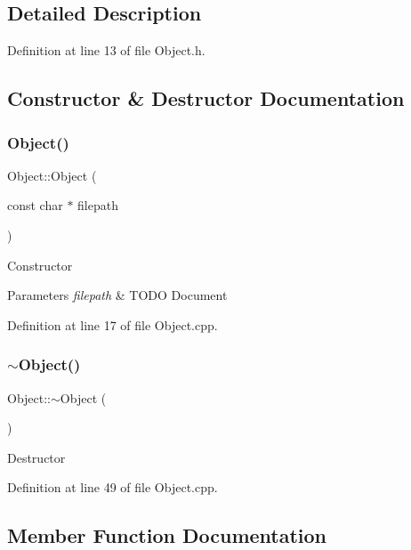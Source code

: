 \subsection{Detailed Description}


Definition at line 13 of file Object.\+h.



\subsection{Constructor \& Destructor Documentation}
\mbox{\label{class_object_a8524d31fc25bf997ae127b85ffebe23e}} 
\subsubsection{\texorpdfstring{Object()}{Object()}}
{\footnotesize\ttfamily Object\+::\+Object (\begin{DoxyParamCaption}\item[{const char $\ast$}]{filepath }\end{DoxyParamCaption})}

Constructor 
\begin{DoxyParams}{Parameters}
{\em filepath} & T\+O\+DO Document \\
\hline
\end{DoxyParams}


Definition at line 17 of file Object.\+cpp.

\mbox{\label{class_object_ae8f5483f459e46687bd01e6f9977afd3}} 
\subsubsection{\texorpdfstring{$\sim$\+Object()}{~Object()}}
{\footnotesize\ttfamily Object\+::$\sim$\+Object (\begin{DoxyParamCaption}{ }\end{DoxyParamCaption})}

Destructor 

Definition at line 49 of file Object.\+cpp.



\subsection{Member Function Documentation}
\mbox{\label{class_object_aa8246a72ca14daf6627b44eaa422c4fb}} 
